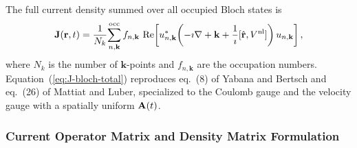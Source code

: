 The full current density summed over all occupied Bloch states is
\begin{equation}
  \mathbf{J}(\mathbf{r},t)
  = \frac{1}{N_k}\!\sum_{n,\mathbf{k}}^{\mathrm{occ}}
    f_{n,\mathbf{k}}\,
    \operatorname{Re}\!\left[
      u_{n,\mathbf{k}}^*\!\left(
      -\imath\nabla + \mathbf{k}
      + \frac{1}{\imath}[\hat{\mathbf{r}},V^{\mathrm{nl}}]
      \right)u_{n,\mathbf{k}}
    \right],
  \label{eq:J-bloch-total}
\end{equation}
where $N_k$ is the number of $\mathbf{k}$-points and $f_{n,\mathbf{k}}$
are the occupation numbers.
Equation~(\ref{eq:J-bloch-total}) reproduces eq.~(8) of Yabana and
Bertsch\cite{yabana-bertsch-1996} and eq.~(26) of Mattiat and
Luber,\cite{Mattiat-Luber-2022} specialized to the Coulomb gauge
and the velocity gauge with a spatially uniform $\mathbf{A}(t)$.

\subsubsection{Current Operator Matrix and Density Matrix Formulation}
\label{sec:current-dm-sec}

